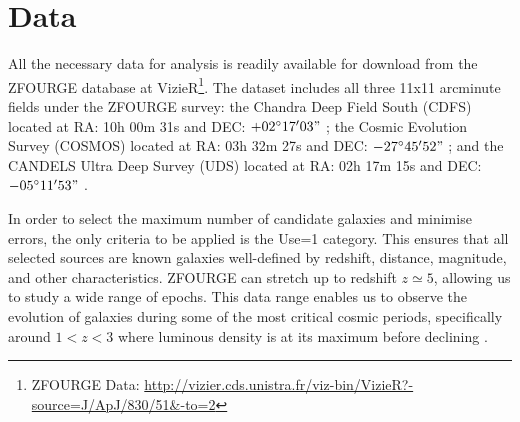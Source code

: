 \section{Data}

All the necessary data for analysis is readily available for download from the ZFOURGE \citep{straatman_fourstar_2016} database at VizieR\footnote{ZFOURGE Data: \url{http://vizier.cds.unistra.fr/viz-bin/VizieR?-source=J/ApJ/830/51&-to=2}}. The dataset includes all three 11x11 arcminute fields under the ZFOURGE survey: the Chandra Deep Field South (CDFS) located at RA: 10h 00m 31s and DEC: $+02^\circ 17' 03"$ \citep{giacconi_chandra_2002}; the Cosmic Evolution Survey (COSMOS) located at RA: 03h 32m 27s and DEC: $-27^\circ 45' 52"$ \citep{scoville_cosmic_2007}; and the CANDELS Ultra Deep Survey (UDS) located at RA: 02h 17m 15s and DEC: $-05^\circ 11' 53"$ \citep{lawrence_ukirt_2007}.

\color{red}
In order to select the maximum number of candidate galaxies and minimise errors, the only criteria to be applied is the Use=1 category. This ensures that all selected sources are known galaxies well-defined by redshift, distance, magnitude, and other characteristics. ZFOURGE can stretch up to redshift $z \simeq 5$, allowing us to study a wide range of epochs. This data range enables us to observe the evolution of galaxies during some of the most critical cosmic periods, specifically around $1 < z < 3$ \citep{gruppioni_modelling_2011, wylezalek_galaxy_2014} where luminous density is at its maximum before declining \citep{assef_mid-ir-_2011}.